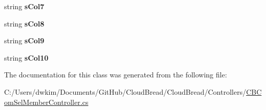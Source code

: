 \begin{DoxyCompactItemize}
\item 
string {\bfseries s\+Col7}\hypertarget{a00156_a44bbd3838d13404d180ef93eee6946dc}{}\label{a00156_a44bbd3838d13404d180ef93eee6946dc}

\item 
string {\bfseries s\+Col8}\hypertarget{a00156_ac37b6b37d1de72870edef7e884adab4d}{}\label{a00156_ac37b6b37d1de72870edef7e884adab4d}

\item 
string {\bfseries s\+Col9}\hypertarget{a00156_a1feea57babcf0e894567a95ddd1395f6}{}\label{a00156_a1feea57babcf0e894567a95ddd1395f6}

\item 
string {\bfseries s\+Col10}\hypertarget{a00156_af1302fc1f27083e108e99d38cda2602a}{}\label{a00156_af1302fc1f27083e108e99d38cda2602a}

\end{DoxyCompactItemize}


The documentation for this class was generated from the following file\+:\begin{DoxyCompactItemize}
\item 
C\+:/\+Users/dwkim/\+Documents/\+Git\+Hub/\+Cloud\+Bread/\+Cloud\+Bread/\+Controllers/\hyperlink{a00202}{C\+B\+Com\+Sel\+Member\+Controller.\+cs}\end{DoxyCompactItemize}
